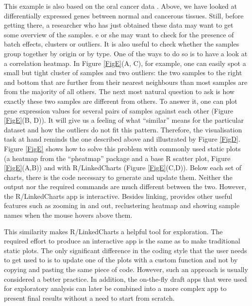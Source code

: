 \documentclass[twocolumn,10pt]{article}
\begin{document}
This example is also based on the oral cancer data \citep{conway_2015}. Above, we have looked at differentially expressed genes between normal and cancerous tissues. Still, before getting there, a researcher who has just obtained these data may want to get some overview of the samples. e or she may want to check for the presence of batch effects, clusters or outliers. It is also useful to check whether the samples group together by origin or by type. One of the ways to do so is to have a look at a correlation heatmap. In Figure \ref{FigE}(A, C), for example, one can easily spot a small but tight cluster of samples and two outliers: the two samples to the right and bottom that are further from their nearest neighbours than most samples are from the majority of all others. The next most natural question to ask is how exactly these two samples are different from others. To answer it, one can plot gene expression values for several pairs of samples against each other (Figure \ref{FigE}(B, D)). It will give us a feeling of what ``similar'' means for the particular dataset and how the outliers do not fit this pattern. Therefore, the visualisation task at hand reminds the one described above and illustrated by Figure \ref{FigD}. Figure \ref{FigE} shows how to solve this problem with commonly used static plots (a heatmap from the ``pheatmap'' package \citep{kolde_2019} and a base R scatter plot, Figure \ref{FigE}(A,B)) and with R/LinkedCharts (Figure \ref{FigE}(C,D)). Below each set of charts, there is the code necessary to generate and update them. Neither the output nor the required commands are much different between the two. However, the R/LinkedCharts app is interactive. Besides linking, provides other useful features such as zooming in and out, reclustering heatmap and showing sample names when the mouse hovers above them.

This similarity makes R/LinkedCharts a helpful tool for exploration. The required effort to produce an interactive app is the same as to make traditional static plots. The only significant difference in the coding style that the user needs to get used to is to update one of the plots with a custom function and not by copying and pasting the same piece of code. However, such an approach is usually considered a better practice. In addition, the on-the-fly draft apps that were used for exploratory analysis can later be combined into a more complex app to present final results without a need to start from scratch.
\end{document}
